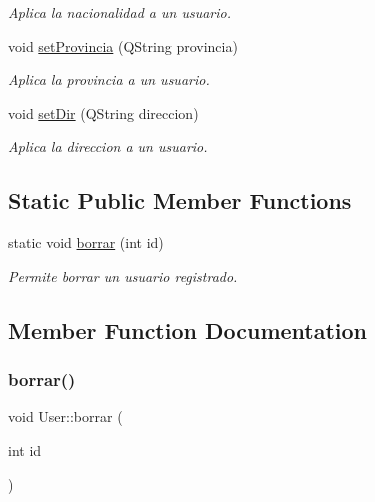 \begin{DoxyCompactItemize}
\begin{DoxyCompactList}\small\item\em Aplica la nacionalidad a un usuario. \end{DoxyCompactList}\item 
void \mbox{\hyperlink{classUser_ad5fa7528ea5397868f5cf2ca99fef6cb}{set\+Provincia}} (Q\+String provincia)
\begin{DoxyCompactList}\small\item\em Aplica la provincia a un usuario. \end{DoxyCompactList}\item 
void \mbox{\hyperlink{classUser_a4b9aee0b43928b561f11d95299af370b}{set\+Dir}} (Q\+String direccion)
\begin{DoxyCompactList}\small\item\em Aplica la direccion a un usuario. \end{DoxyCompactList}\end{DoxyCompactItemize}
\subsection*{Static Public Member Functions}
\begin{DoxyCompactItemize}
\item 
static void \mbox{\hyperlink{classUser_a82d051296c16957a6a6a41e582c1b963}{borrar}} (int id)
\begin{DoxyCompactList}\small\item\em Permite borrar un usuario registrado. \end{DoxyCompactList}\end{DoxyCompactItemize}


\subsection{Member Function Documentation}
\mbox{\label{classUser_a82d051296c16957a6a6a41e582c1b963}} 
\subsubsection{\texorpdfstring{borrar()}{borrar()}}
{\footnotesize\ttfamily void User\+::borrar (\begin{DoxyParamCaption}\item[{int}]{id }\end{DoxyParamCaption})\hspace{0.3cm}{\ttfamily [static]}}



